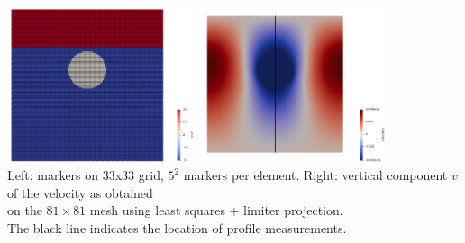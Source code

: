 \begin{center}
\includegraphics[width=5.5cm]{python_codes/fieldstone_41/results/exp3/markers}
\includegraphics[width=5.5cm]{python_codes/fieldstone_41/results/exp3/vel_line}\\
{\captionfont 
Left: markers on 33x33 grid, $5^2$ markers per element.  
Right: vertical component $v$ of the velocity as obtained \\
on the $81\times81$ mesh using least squares + limiter projection.\\
The black line indicates the location of profile measurements.}
\end{center}

